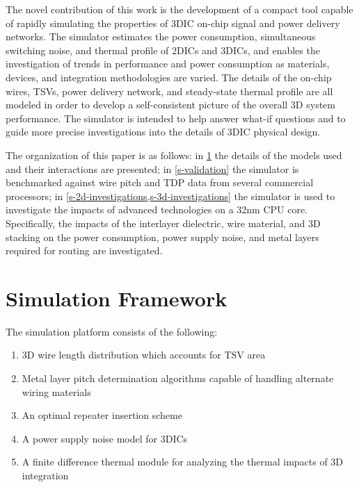 \documentclass[journal,twoside]{IEEEtran}
\newcommand{\changed}[1]{\textcolor{red}{#1}}
\renewcommand{\changed}[1]{#1} %
\begin{document}

\changed{The novel contribution of this work is the development of a compact tool capable of rapidly simulating the
properties of 3DIC on-chip signal and power delivery networks.
The simulator estimates the power consumption, simultaneous switching noise, and thermal profile of 2DICs and 3DICs, 
and enables the investigation of trends in performance and power consumption
as materials, devices, and integration methodologies are varied.
The details of the on-chip wires, TSVs, power delivery network, and steady-state thermal profile
are all modeled in order to develop a self-consistent picture of the overall 3D system performance.
The simulator is intended to help answer what-if questions
and to guide more precise investigations
into the details of 3DIC physical design.}

\changed{The organization of this paper is as follows: 
in \cref{s-virtual-platform} the details of the models used and their interactions are presented;
in \cref{s-validation} the simulator is benchmarked against
wire pitch and TDP data from several commercial processors;
in \cref{s-2d-investigations,s-3d-investigations} the simulator
is used to investigate the impacts of advanced
technologies on a 32nm CPU core.}
Specifically, the impacts of the interlayer dielectric, wire material, and 3D stacking on the power consumption,
power supply noise, and metal layers required for routing are investigated.

\section{Simulation Framework} \label{s-virtual-platform}
The simulation platform consists of the following:
 \begin{enumerate}
	\item 3D wire length distribution which accounts for TSV area
	\item Metal layer pitch determination algorithms capable of handling alternate wiring materials
	\item An optimal repeater insertion scheme
	\item A power supply noise model for 3DICs
	\item A finite difference thermal module for analyzing the thermal impacts of 3D integration
\end{enumerate}
\end{document}
